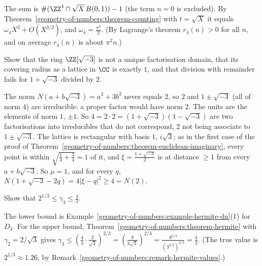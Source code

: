 \begin{solution}
The sum is $\#(\ZZ^4 \cap \sqrt X\,B(0, 1)) - 1$ (the term $n = 0$ is excluded). By Theorem~\ref{geometry-of-numbers:theorem-counting} with $t = \sqrt X$ it equals
$\omega_4X^2 + O(X^{3/2})$, and $\omega_4 = \frac{\pi^2}{2}$. (By Lagrange's theorem $r_4(n) > 0$ for all $n$, and on average $r_4(n)$ is about $\pi^2n$.)
\end{solution}

\begin{exercise}\label{geometry-of-numbers:exercise-z-sqrt-minus-three}
Show that the ring $\ZZ[\sqrt{-3}]$ is not a unique factorisation domain, that its covering radius as a lattice in $\CC$ is exactly $1$, and that division with remainder fails for $1 + \sqrt{-3}$ divided by $2$.
\end{exercise}

\begin{solution}
The norm $N(a + b\sqrt{-3}) = a^2 + 3b^2$ never equals $2$, so $2$ and $1 \pm \sqrt{-3}$ (all of norm $4$) are irreducible: a proper factor would have norm $2$. The units are the elements of norm $1$,
$\pm1$. So $4 = 2 \cdot 2 = (1 + \sqrt{-3})(1 - \sqrt{-3})$ are two factorisations into irreducibles that do not correspond, $2$ not being associate to $1 \pm \sqrt{-3}$. The lattice is rectangular with basis
$1$, $i\sqrt3$; as in the first case of the proof of Theorem~\ref{geometry-of-numbers:theorem-euclidean-imaginary}, every point is within $\sqrt{\frac14 + \frac34} = 1$ of it, and
$\xi = \frac{1 + \sqrt{-3}}{2}$ is at distance $\geq 1$ from every $a + b\sqrt{-3}$. So $\mu = 1$, and for every $q$, $N(1 + \sqrt{-3} - 2q) = 4|\xi - q|^2 \geq 4 = N(2)$.
\end{solution}

\begin{exercise}\label{geometry-of-numbers:exercise-hermite-three}
Show that $2^{1/3} \leq \gamma_3 \leq \frac43$.
\end{exercise}

\begin{solution}
The lower bound is Example~\ref{geometry-of-numbers:example-hermite-dn}(1) for $D_3$. For the upper bound, Theorem~\ref{geometry-of-numbers:theorem-hermite} with $\gamma_2 = 2/\sqrt3$ gives
$\gamma_3 \leq (\frac43 \cdot \frac{2}{\sqrt3})^{2/3} = (\frac{8}{3\sqrt3})^{2/3} = \frac{8^{2/3}}{(3^{3/2})^{2/3}} = \frac43$. (The true value is $2^{1/3} \approx 1.26$, by Remark~\ref{geometry-of-numbers:remark-hermite-values}.)
\end{solution}

